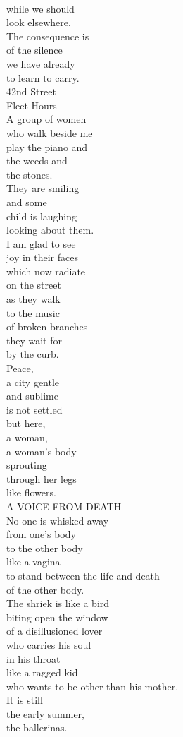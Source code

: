 \documentclass[smalldemyvopaper,11pt,twoside,onecolumn,openright,extrafontsizes]{memoir}
\begin{document}
\\while we should
\\look elsewhere.
\\The consequence is
\\of the silence
\\we have already
\\to learn to carry.
\\42nd Street
\\Fleet Hours
\\A group of women
\\who walk beside me
\\play the piano and
\\the weeds and
\\the stones.
\\They are smiling
\\and some
\\child is laughing
\\looking about them.
\\I am glad to see
\\joy in their faces
\\which now radiate
\\on the street
\\as they walk
\\to the music
\\of broken branches
\\they wait for
\\by the curb.
\\Peace,
\\a city gentle
\\and sublime
\\is not settled
\\but here,
\\a woman,
\\a woman's body
\\sprouting
\\through her legs
\\like flowers.
\\A VOICE FROM DEATH
\\No one is whisked away
\\from one's body
\\to the other body
\\like a vagina
\\to stand between the life and death
\\of the other body.
\\The shriek is like a bird
\\biting open the window
\\of a disillusioned lover
\\who carries his soul
\\in his throat
\\like a ragged kid
\\who wants to be other than his mother.
\\It is still
\\the early summer,
\\the ballerinas.
\end{document}
